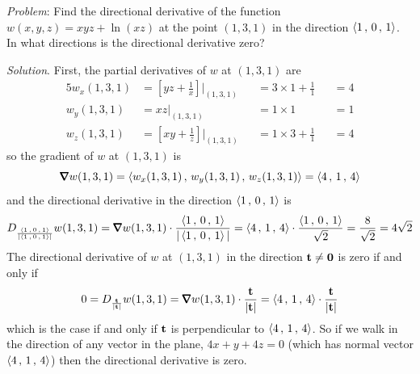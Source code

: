 \begin{eg}\label{eg dir deriv B}
\noindent\textit{Problem}:
Find the directional derivative of the function $w(x,y,z)=xyz +\ln(xz)$
at the point $(1,3,1)$ in the direction $\left< 1\,,\,0\,,\,1\right>$. 
In what directions is the directional derivative zero?

\medskip
\noindent\textit{Solution}. 
First, the partial derivatives of $w$ at $(1,3,1)$ are
\begin{alignat*}{5}
w_x(1,3,1) &= \left[yz+\frac{1}{x}\right]\bigg|_{(1,3,1)} 
             &&=3\times 1+\frac{1}{1}&&=4 \\
w_y(1,3,1) &= xz\bigg|_{(1,3,1)} &&=1\times 1&&=1 \\
w_z(1,3,1) &= \left[xy+\frac{1}{z}\right]\bigg|_{(1,3,1)} &&=1\times 3 +\frac{1}{1} &&=4
\end{alignat*}
so the gradient of $w$ at $(1,3,1)$ is
\begin{equation*}
\vnabla w(1,3,1) = \llt w_x(1,3,1)\,,\,w_y(1,3,1)\,,\,w_z(1,3,1)\rgt
               = \llt 4\,,\,1\,,\,4\rgt
\end{equation*}
and the directional derivative in the direction $\left< 1\,,\,0\,,\,1\right>$ is
\begin{equation*}
D_{\frac{\llt 1\,,\,0\,,\,1\rgt}{|\llt 1\,,\,0\,,\,1\rgt|}} w(1,3,1) 
   = \vnabla w(1,3,1)\cdot
              \frac{\llt 1\,,\,0\,,\,1\rgt}{|\llt 1\,,\,0\,,\,1\rgt|}
   = \llt 4\,,\,1\,,\,4\rgt\cdot \frac{\llt 1\,,\,0\,,\,1\rgt}{\sqrt{2}}
   = \frac{8}{\sqrt{2}}=4\sqrt{2}
\end{equation*}
The directional derivative of $w$ at $(1,3,1)$ in the direction $\mathbf{t}\ne\mathbf{0}$
is zero if and only if
\begin{equation*}
0 = D_{\frac{\vt}{|\vt|}} w(1,3,1) 
   = \vnabla w(1,3,1)\cdot\frac{\vt}{|\vt|}
   = \llt 4\,,\,1\,,\,4\rgt\cdot \frac{\vt}{|\vt|}
\end{equation*}
which is the case if and only if $\mathbf{t}$ is perpendicular to
$\left< 4\,,\,1\,,\,4\right>$. So if we walk in the direction of any vector
in the plane, $4x+y+4z=0$ (which has normal vector $\left< 4\,,\,1\,,\,4\right>$)
then the directional derivative is zero.


\end{eg}

